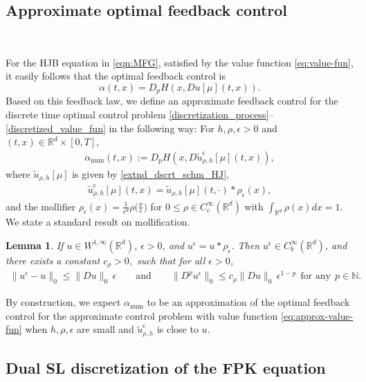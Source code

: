 \documentclass[a4paper,  twoside, 10pt, leqno]{amsart}
\newcommand{\N}{\mathbb{N}}
\newcommand{\R}{\mathbb{R}}
\newcommand{\rd}{\mathbb{R}^d}
\newtheorem{lemma}[thm]{Lemma}
\theoremstyle{remark}
\theoremstyle{definition}
\begin{document}
\subsection{Approximate optimal feedback control} \label{subsec:ctrl}\ 
\smallskip

\noindent 
For the HJB equation in \eqref{eqn:MFG}, satisfied by the
value function \eqref{eq:value-fun}, it easily follows that the optimal feedback
control is
$$\alpha(t,x) = D_p H(x, Du[\mu](t,x)).$$
 Based on this feedback law, we define an approximate
feedback control for the  discrete time optimal control problem
\eqref{discretization_process}--\eqref{discretized_value_fun}
 in the following way: For 
$h,\rho,\epsilon>0$ and $(t,x)\in \R^d\times[0,T]$,
\begin{align}\label{alp_num}\alpha_{\text{num}}(t,x) :=
  D_p H(x, D\tilde u^{\epsilon}_{\rho,h}[\mu](t,x)),
  \end{align}
where $\tilde u_{\rho,h}[\mu]$ is given by \eqref{extnd_dscrt_schm_HJ},
\begin{align}\label{cont_extnd_dscrt_schm_HJ}
\tilde u_{\rho,h}^{\epsilon}[\mu](t,x) =
\tilde u_{\rho,h}[\mu](t, \cdot)*\rho_{\epsilon}(x),
\end{align}
and the mollifier $\rho_{\epsilon}(x)=
\frac{1}{\epsilon^{d}}\rho\big(\frac{x}{\epsilon}\big)$ for $0\leq 
\rho \in C_c^{\infty}(\rd)$ with $\int_{\rd} \rho(x)dx=1$.  We state a standard result on mollification. 
\begin{lemma} \label{regularized_Lipschitz}
If $u\in W^{1,\infty}(\rd)$, $\epsilon>0$, and
$u^{\epsilon}=u*\rho_\epsilon$. Then 
$u^{\epsilon} \in C_b^\infty(\R^d)$, and there exists a constant $c_\rho>0,$ such that for all $\epsilon>0$,
\begin{align*}
\|u^{\epsilon} -u\|_0 \leq \|Du\|_0\, \epsilon\qquad  
\mbox{and} \qquad  \|D^p u^{\epsilon}\|_0 \leq c_\rho \|Du\|_0 \,\epsilon^{1-p}
\ \ \text{for any} \ \ p \in \N.
\end{align*}  
\end{lemma}
 By construction, we expect $\alpha_{\text{num}}$ to
 be an approximation of the optimal feedback 
 control for the approximate control problem with value function
 \eqref{eq:approx-value-fun} when $h,\rho,\epsilon$ are small and
 $\tilde u^{\epsilon}_{\rho,h}$ is close to $u$.


\subsection{Dual SL discretization of the FPK equation}\label{subsec:discrtFPK}
\end{document}
